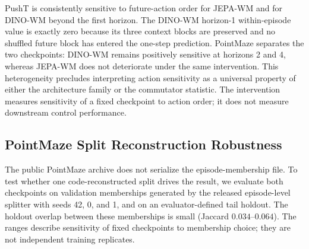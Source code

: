 \documentclass{article}
\begin{document}
PushT is consistently sensitive to future-action order for JEPA-WM and for
DINO-WM beyond the first horizon. The DINO-WM horizon-1 within-episode value is
exactly zero because its three context blocks are preserved and no shuffled
future block has entered the one-step prediction. PointMaze separates the two
checkpoints: DINO-WM remains positively sensitive at horizons 2 and 4, whereas
JEPA-WM does not deteriorate under the same intervention. This heterogeneity
precludes interpreting action sensitivity as a universal property of either
the architecture family or the commutator statistic. The intervention measures
sensitivity of a fixed checkpoint to action order; it does not measure downstream
control performance.

\subsection{PointMaze Split Reconstruction Robustness}
\label{sec:supp-split-robustness}

The public PointMaze archive does not serialize the episode-membership file.
To test whether one code-reconstructed split drives the result, we evaluate both
checkpoints on validation memberships generated by the released
episode-level splitter with seeds 42, 0, and 1, and on an evaluator-defined
tail holdout. The holdout overlap between these memberships is small
(Jaccard $0.034$--$0.064$). The ranges describe sensitivity of fixed
checkpoints to membership choice; they are not independent training
replicates.

\begin{table}[H]
\centering
\small
\setlength{\tabcolsep}{4pt}
\caption{PointMaze robustness across reconstructed memberships.
The operator fit uses rank 8 and ridge $10^{-2}$. The final column is
the held-out paired $R^2$ minus its pair-shuffled control; a positive range
means paired temporal correspondence survives every evaluated membership.}
\label{tab:supp-split-robustness}
\end{table}
\end{document}
